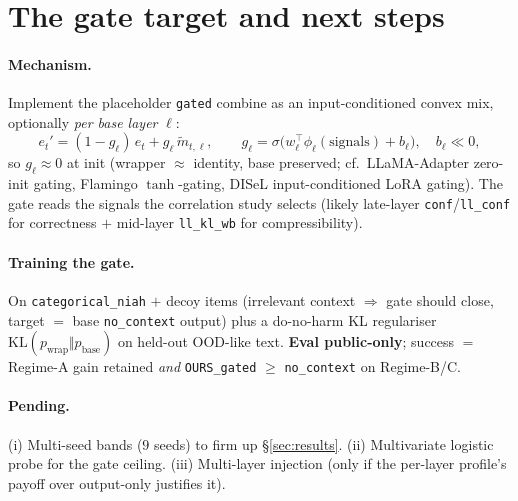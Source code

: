 \documentclass[11pt]{article}
\newcommand{\noctx}{\texttt{no\_context}}
\newcommand{\code}[1]{\texttt{#1}}
\begin{document}
\section{The gate target and next steps}
\label{sec:gate-target}

\paragraph{Mechanism.} Implement the placeholder \code{gated} combine as
an input-conditioned convex mix, optionally \emph{per base layer} $\ell$:
\begin{equation}
e_t' = (1-g_\ell)\,e_t + g_\ell\,\tilde m_{t,\ell},
\qquad
g_\ell = \sigma\!\big(w_\ell^\top \phi_\ell(\text{signals}) + b_\ell\big),
\quad b_\ell \ll 0,
\end{equation}
so $g_\ell\!\approx\!0$ at init (wrapper $\approx$ identity, base
preserved; cf.\ LLaMA-Adapter zero-init gating, Flamingo $\tanh$-gating,
DISeL input-conditioned LoRA gating). The gate reads the signals the
correlation study selects (likely late-layer \code{conf}/\code{ll\_conf}
for correctness $+$ mid-layer \code{ll\_kl\_wb} for compressibility).

\paragraph{Training the gate.} On \code{categorical\_niah} $+$ decoy
items (irrelevant context $\Rightarrow$ gate should close, target $=$
base \noctx{} output) plus a do-no-harm KL regulariser
$\mathrm{KL}(p_{\mathrm{wrap}}\Vert p_{\mathrm{base}})$ on held-out
OOD-like text. \textbf{Eval public-only}; success $=$ Regime-A gain
retained \emph{and} \code{OURS\_gated} $\ge$ \noctx{} on Regime-B/C.

\paragraph{Pending.} (i) Multi-seed bands ($9$ seeds) to firm up
\S\ref{sec:results}. (ii) Multivariate logistic probe for the gate
ceiling. (iii) Multi-layer injection (only if the per-layer profile's
payoff over output-only justifies it).

\end{document}
